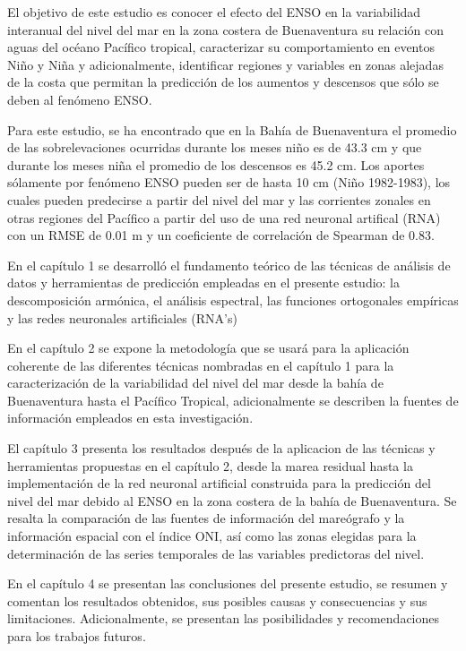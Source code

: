 \newpage

El objetivo de este estudio es conocer el efecto del ENSO en la variabilidad interanual del nivel del mar en la zona costera de Buenaventura su relación con aguas del océano Pacífico tropical, caracterizar su comportamiento en eventos Niño y Niña \citep{Wang2018} y adicionalmente, identificar regiones y variables en zonas alejadas de la costa que permitan la predicción de los aumentos y descensos que sólo se deben al fenómeno ENSO.

Para este estudio, se ha encontrado que en la Bahía de Buenaventura el promedio de las sobrelevaciones ocurridas durante los meses niño es de 43.3 cm y que durante los meses niña el promedio de los descensos es 45.2 cm. Los aportes sólamente por fenómeno ENSO pueden ser de hasta 10 cm (Niño 1982-1983), los cuales pueden predecirse a partir del nivel del mar y las corrientes zonales en otras regiones del Pacífico a partir del uso de una red neuronal artifical (RNA) con un RMSE de 0.01 m y un coeficiente de correlación de Spearman de 0.83. 

En el capítulo 1 se desarrolló el fundamento teórico de las técnicas de análisis de datos y herramientas de predicción empleadas en el presente estudio: la descomposición armónica, el análisis espectral, las funciones ortogonales empíricas y las redes neuronales artificiales (RNA's)

En el capítulo 2 se expone la metodología que se usará para la aplicación coherente de las diferentes técnicas nombradas en el capítulo 1 para la caracterización de la variabilidad del nivel del mar desde la bahía de Buenaventura hasta el Pacífico Tropical, adicionalmente se describen la fuentes de información empleados en esta investigación.

El capítulo 3 presenta los resultados después de la aplicacion de las técnicas y herramientas propuestas en el capítulo 2, desde la marea residual hasta la implementación de la red neuronal artificial construida para la predicción del nivel del mar debido al ENSO en la zona costera de la bahía de Buenaventura. Se resalta la comparación de las fuentes de información del mareógrafo y la información espacial con el índice ONI, así como las zonas elegidas para la determinación de las series temporales de las variables predictoras del nivel.

En el capítulo 4 se presentan las conclusiones del presente estudio, se resumen y comentan los resultados obtenidos, sus posibles causas y consecuencias y sus limitaciones. Adicionalmente, se presentan las posibilidades y recomendaciones para los trabajos futuros.

